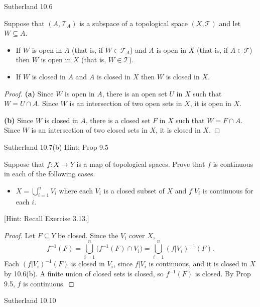 \documentclass[minion]{homework}
\begin{document}
\begin{problems}

\problem Sutherland 10.6

Suppose that $(A, \mathcal{T}_A)$ is a subspace of a topological space $(X, \mathcal{T})$ and let $W \subseteq A$.
\begin{itemize}
  \item[(a)] If $W$ is open in $A$ (that is, if $W \in \mathcal{T}_A$) and $A$ is open in $X$ (that is, if $A \in \mathcal{T}$) then $W$ is open in $X$ (that is, $W \in \mathcal{T}$).
  \item[(b)] If $W$ is closed in $A$ and $A$ is closed in $X$ then $W$ is closed in $X$.
\end{itemize}

\begin{proof}
\textbf{(a)} Since $W$ is open in $A$, there is an open set $U$ in $X$ such that $W = U \cap A$. Since $W$ is an intersection of two open sets in $X$, it is open in $X$.

\textbf{(b)} Since $W$ is closed in $A$, there is a closed set $F$ in $X$ such that $W = F \cap A$. Since $W$ is an intersection of two closed sets in $X$, it is closed in $X$.
\end{proof}

\problem Sutherland 10.7(b) Hint: Prop 9.5

Suppose that $f : X \to Y$ is a map of topological spaces. Prove that $f$ is continuous in each of the following cases.
\begin{itemize}
  \item[(b)] $X = \bigcup_{i=1}^{n} V_i$ where each $V_i$ is a closed subset of $X$ and $f|V_i$ is continuous for each $i$.
\end{itemize}
[Hint: Recall Exercise 3.13.]

\begin{proof}
Let $F \subseteq Y$ be closed. Since the $V_i$ cover $X$,
\[
f^{-1}(F) = \bigcup_{i=1}^{n} \big(f^{-1}(F) \cap V_i\big) = \bigcup_{i=1}^{n} (f|V_i)^{-1}(F).
\]
Each $(f|V_i)^{-1}(F)$ is closed in $V_i$, since $f|V_i$ is continuous, and it is closed in $X$ by 10.6(b). A finite union of closed sets is closed, so $f^{-1}(F)$ is closed. By Prop 9.5, $f$ is continuous.
\end{proof}

\problem Sutherland 10.10


\end{problems}
\end{document}
